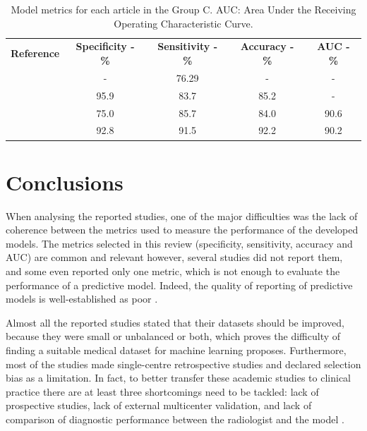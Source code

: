 \documentclass[11pt]{article}
\begin{document}
\begin{table}[]
    \centering
    \begin{tabular}{ccccc}\toprule
        \multirow{2}{*}{\textbf{Reference}} & \multirow{2}{*}{\textbf{Specificity - \%}} & \multirow{2}{*}{\textbf{Sensitivity - \%}} & \multirow{2}{*}{\textbf{Accuracy - \%}} & \multirow{2}{*}{\textbf{AUC - \%}} \\
        \\\midrule
        \cite{Bi2017}                       & -                                          & 76.29                                      & -                                       & -                                  \\
        \cite{Bi2022}                       & 95.9                                       & 83.7                                       & 85.2                                    & -                                  \\
        \cite{Kong2022}                     & 75.0                                       & 85.7                                       & 84.0                                    & 90.6                               \\
        \cite{Zheng2020}                    & 92.8                                       & 91.5                                       & 92.2                                    & 90.2                               \\
        \bottomrule
    \end{tabular}
    \caption{Model metrics for each article in the Group C. AUC: Area Under the Receiving Operating Characteristic Curve.}
    \label{tab:res_C}
\end{table}

\section{Conclusions}

When analysing the reported studies, one of the major difficulties was the lack
of coherence between the metrics used to measure the performance of the
developed models. The metrics selected in this review (specificity, sensitivity,
accuracy and AUC) are common and relevant
however, several studies did not report them, and some even reported only one
metric, which is not enough to evaluate the performance of a predictive model.
Indeed, the quality of reporting of predictive models is well-established as
poor \cite{Zhang2022}.

Almost all the reported studies stated that their datasets should be improved,
because they were small or unbalanced or both, which proves the difficulty of
finding a suitable medical dataset for machine learning proposes. Furthermore,
most of the studies made single-centre retrospective studies and declared
selection bias as a limitation. In fact, to better transfer these academic
studies to clinical practice there are at least three shortcomings need to be tackled: lack
of prospective studies, lack of external multicenter validation, and lack of
comparison of diagnostic performance between the radiologist and the model
\cite{Zhang2022}.
\end{document}

